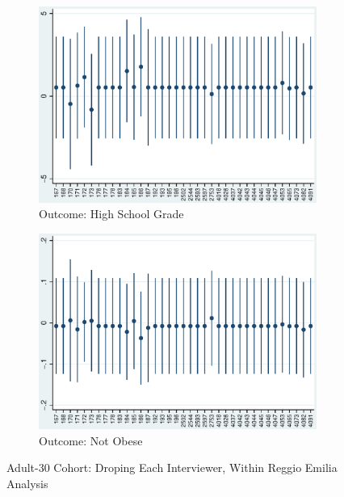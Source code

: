     \begin{figure}[H]
      \centering
        \begin{subfigure}[t]{0.75\textwidth}
          \includegraphics[width=\textwidth]{../../../output/image/coef-interviewer-adult30-votoMaturita.eps}       
\caption{Outcome: High School Grade}        
        \end{subfigure}
        \begin{subfigure}[t]{0.75\textwidth}
          \includegraphics[width=\textwidth]{../../../output/image/coef-interviewer-adult30-BMI_obese.eps}       
 \caption{Outcome: Not Obese}        
        \end{subfigure}
      \caption{Adult-30 Cohort: Droping Each Interviewer, Within Reggio Emilia Analysis}  \label{fig:adult30-sensitivity-interviewer}
    \end{figure}


